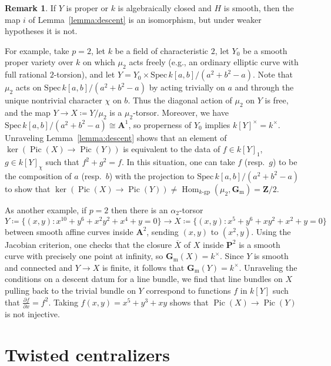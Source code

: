 \documentclass[11pt,reqno]{amsart}
\theoremstyle{definition}
\newtheorem{remark}[theorem]{Remark}
\renewcommand{\rm}{\mathrm}
\newcommand{\Spec}{\mathrm{Spec} \,}
\newcommand{\bA}{{\mathbf A}}
\newcommand{\bG}{{\mathbf G}}
\newcommand{\bP}{{\mathbf P}}
\newcommand{\bZ}{{\mathbf Z}}
\newcommand{\bGm}{\bG_{\rm{m}}}
\DeclareMathOperator{\Hom}{Hom}
\DeclareMathOperator{\Pic}{Pic}
\newcommand{\gp}[1]{#1\textrm{-}\rm{gp}}
\begin{document}
\begin{remark}\label{remark:alpha2-torsor}
If $Y$ is proper or $k$ is algebraically closed and $H$ is smooth, then the map $i$ of Lemma~\ref{lemma:descent} is an isomorphism, but under weaker hypotheses it is not.

For example, take $p = 2$, let $k$ be a field of characteristic $2$, let $Y_0$ be a smooth proper variety over $k$ on which $\mu_2$ acts freely (e.g., an ordinary elliptic curve with full rational $2$-torsion), and let $Y = Y_0 \times \Spec k[a, b]/(a^2 + b^2 - a)$. Note that $\mu_2$ acts on $\Spec k[a, b]/(a^2 + b^2 - a)$ by acting trivially on $a$ and through the unique nontrivial character $\chi$ on $b$. Thus the diagonal action of $\mu_2$ on $Y$ is free, and the map $Y \to X \coloneqq Y/\mu_2$ is a $\mu_2$-torsor. Moreover, we have $\Spec k[a, b]/(a^2 + b^2 - a) \cong \bA^1$, so properness of $Y_0$ implies $k[Y]^\times = k^\times$. Unraveling Lemma~\ref{lemma:descent} shows that an element of $\ker(\Pic(X) \to \Pic(Y))$ is equivalent to the data of $f \in k[Y]_1$, $g \in k[Y]_\chi$ such that $f^2 + g^2 = f$. In this situation, one can take $f$ (resp.\ $g$) to be the composition of $a$ (resp.\ $b$) with the projection to $\Spec k[a, b]/(a^2 + b^2 - a)$ to show that $\ker(\Pic(X) \to \Pic(Y)) \neq \Hom_{\gp{k}}(\mu_2, \bGm) = \bZ/2$.

As another example, if $p = 2$ then there is an $\alpha_2$-torsor
\[
Y \coloneqq \{(x, y): x^{10} + y^6 + x^2y^2 + x^4 + y = 0\} \to X \coloneqq \{(x, y): x^5 + y^6 + xy^2 + x^2 + y = 0\}
\]
between smooth affine curves inside $\bA^2$, sending $(x, y)$ to $(x^2, y)$. Using the Jacobian criterion, one checks that the closure $\overline{X}$ of $X$ inside $\bP^2$ is a smooth curve with precisely one point at infinity, so $\bGm(X) = k^\times$. Since $Y$ is smooth and connected and $Y \to X$ is finite, it follows that $\bGm(Y) = k^\times$. Unraveling the conditions on a descent datum for a line bundle, we find that line bundles on $X$ pulling back to the trivial bundle on $Y$ correspond to functions $f$ in $k[Y]$ such that $\frac{\partial{f}}{\partial{x}} = f^2$. Taking $f(x, y) = x^5 + y^3 + xy$ shows that $\Pic(X) \to \Pic(Y)$ is not injective.
\end{remark}







\section{Twisted centralizers}\label{section:twisted}
\end{document}
